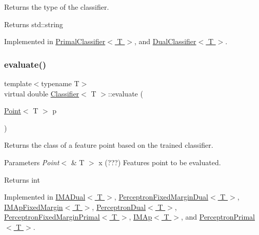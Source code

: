 Returns the type of the classifier. 

\begin{DoxyReturn}{Returns}
std\+::string 
\end{DoxyReturn}


Implemented in \hyperlink{class_primal_classifier_a637fc3cb89994277e902758c7fc3f763}{Primal\+Classifier$<$ T $>$}, and \hyperlink{class_dual_classifier_af1217d4b44e417817a25157bb3f9b6d9}{Dual\+Classifier$<$ T $>$}.

\mbox{\label{class_classifier_ab3b9544a8d9c3cbde8d5865c7e9be0fb}} 
\subsubsection{\texorpdfstring{evaluate()}{evaluate()}}
{\footnotesize\ttfamily template$<$typename T$>$ \\
virtual double \hyperlink{class_classifier}{Classifier}$<$ T $>$\+::evaluate (\begin{DoxyParamCaption}\item[{\hyperlink{class_point}{Point}$<$ T $>$}]{p }\end{DoxyParamCaption})\hspace{0.3cm}{\ttfamily [pure virtual]}}



Returns the class of a feature point based on the trained classifier. 


\begin{DoxyParams}{Parameters}
{\em Point$<$} & T $>$ x (???) Features point to be evaluated. \\
\hline
\end{DoxyParams}
\begin{DoxyReturn}{Returns}
int 
\end{DoxyReturn}


Implemented in \hyperlink{class_i_m_a_dual_af67dfc75554d055cfdf761ee940243d7}{I\+M\+A\+Dual$<$ T $>$}, \hyperlink{class_perceptron_fixed_margin_dual_acafabadf6d2552fde0bfb32f0344c6e3}{Perceptron\+Fixed\+Margin\+Dual$<$ T $>$}, \hyperlink{class_i_m_ap_fixed_margin_a909eb58c78c20780494598b478f8846f}{I\+M\+Ap\+Fixed\+Margin$<$ T $>$}, \hyperlink{class_perceptron_dual_afae65908732e5f011be1d384387c71fe}{Perceptron\+Dual$<$ T $>$}, \hyperlink{class_perceptron_fixed_margin_primal_a5bfe0f03533361017b594c3fe67f0905}{Perceptron\+Fixed\+Margin\+Primal$<$ T $>$}, \hyperlink{class_i_m_ap_a41b0739cdc486e3f21e7927f1ad429a8}{I\+M\+Ap$<$ T $>$}, and \hyperlink{class_perceptron_primal_a547d98d8d61480d5bc44fe759c3a8e28}{Perceptron\+Primal$<$ T $>$}.

